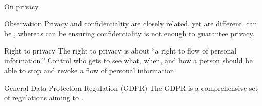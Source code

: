 \begin{slide}{On privacy}
  \begin{block}{Observation}
    Privacy and confidentiality are closely related, yet are different.  can be ,
    whereas  can be  \mathexpr{\Rightarrow} ensuring confidentiality is
    not enough to guarantee privacy.
  \end{block}

  \begin{block}{Right to privacy}
    The right to privacy is about ``a right to  flow of personal information.'' Control who
    gets to see what, when, and how \mathexpr{\Rightarrow} a person should be able to stop and revoke a flow
    of personal information.
  \end{block}

  \begin{alertblock}{General Data Protection Regulation (GDPR)}
    The GDPR is a comprehensive set of regulations aiming to . 
  \end{alertblock}
\end{slide}
